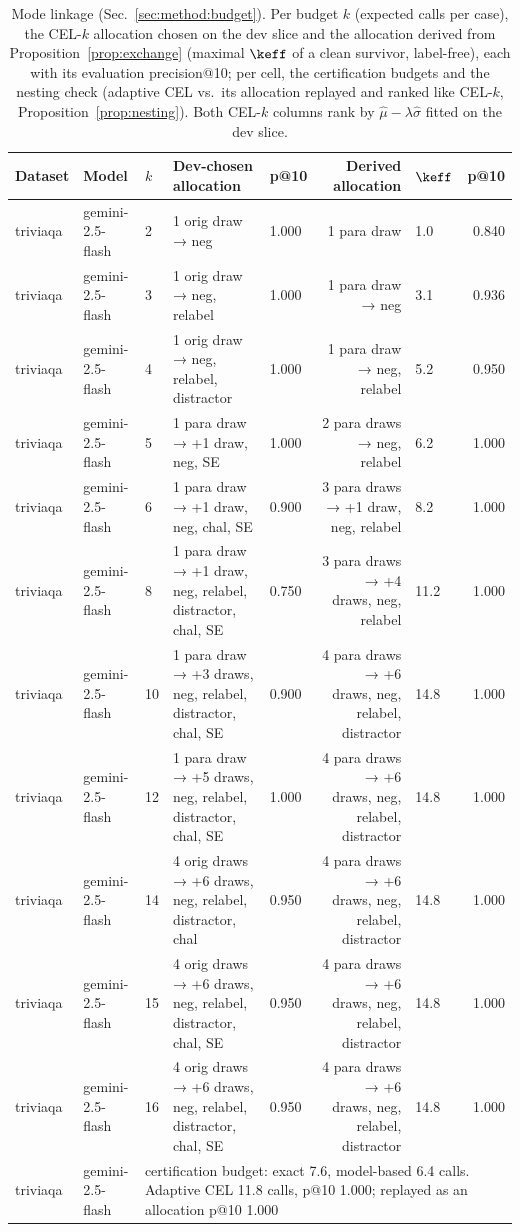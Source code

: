 \begin{table}[t]
\centering
\small
\begin{tabular}{lllllrlr}
\toprule
Dataset & Model & $k$ & Dev-chosen allocation & p@10 & Derived allocation & $\keff$ & p@10 \\
\midrule
triviaqa & gemini-2.5-flash & 2 & 1 orig draw → neg & 1.000 & 1 para draw & 1.0 & 0.840 \\
triviaqa & gemini-2.5-flash & 3 & 1 orig draw → neg, relabel & 1.000 & 1 para draw → neg & 3.1 & 0.936 \\
triviaqa & gemini-2.5-flash & 4 & 1 orig draw → neg, relabel, distractor & 1.000 & 1 para draw → neg, relabel & 5.2 & 0.950 \\
triviaqa & gemini-2.5-flash & 5 & 1 para draw → +1 draw, neg, SE & 1.000 & 2 para draws → neg, relabel & 6.2 & 1.000 \\
triviaqa & gemini-2.5-flash & 6 & 1 para draw → +1 draw, neg, chal, SE & 0.900 & 3 para draws → +1 draw, neg, relabel & 8.2 & 1.000 \\
triviaqa & gemini-2.5-flash & 8 & 1 para draw → +1 draw, neg, relabel, distractor, chal, SE & 0.750 & 3 para draws → +4 draws, neg, relabel & 11.2 & 1.000 \\
triviaqa & gemini-2.5-flash & 10 & 1 para draw → +3 draws, neg, relabel, distractor, chal, SE & 0.900 & 4 para draws → +6 draws, neg, relabel, distractor & 14.8 & 1.000 \\
triviaqa & gemini-2.5-flash & 12 & 1 para draw → +5 draws, neg, relabel, distractor, chal, SE & 1.000 & 4 para draws → +6 draws, neg, relabel, distractor & 14.8 & 1.000 \\
triviaqa & gemini-2.5-flash & 14 & 4 orig draws → +6 draws, neg, relabel, distractor, chal & 0.950 & 4 para draws → +6 draws, neg, relabel, distractor & 14.8 & 1.000 \\
triviaqa & gemini-2.5-flash & 15 & 4 orig draws → +6 draws, neg, relabel, distractor, chal, SE & 0.950 & 4 para draws → +6 draws, neg, relabel, distractor & 14.8 & 1.000 \\
triviaqa & gemini-2.5-flash & 16 & 4 orig draws → +6 draws, neg, relabel, distractor, chal, SE & 0.950 & 4 para draws → +6 draws, neg, relabel, distractor & 14.8 & 1.000 \\
triviaqa & gemini-2.5-flash & \multicolumn{6}{l}{certification budget: exact 7.6, model-based 6.4 calls. Adaptive CEL 11.8 calls, p@10 1.000; replayed as an allocation p@10 1.000} \\
\bottomrule
\end{tabular}
\caption{Mode linkage (Sec.~\ref{sec:method:budget}). Per budget $k$ (expected calls per case), the CEL-$k$ allocation chosen on the dev slice and the allocation derived from Proposition~\ref{prop:exchange} (maximal $\keff$ of a clean survivor, label-free), each with its evaluation precision@10; per cell, the certification budgets and the nesting check (adaptive CEL vs.\ its allocation replayed and ranked like CEL-$k$, Proposition~\ref{prop:nesting}). Both CEL-$k$ columns rank by $\hat\mu - \lambda\hat\sigma$ fitted on the dev slice.}
\label{tab:mode_linkage}
\end{table}
